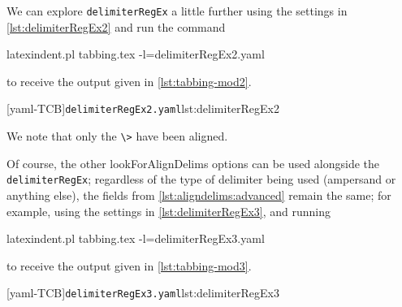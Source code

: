  \begin{example}
 We can explore \texttt{delimiterRegEx} a little further using the settings in
 \cref{lst:delimiterRegEx2} and run the command 

 \begin{commandshell}
latexindent.pl tabbing.tex -l=delimiterRegEx2.yaml
\end{commandshell}

 to receive the output given in \cref{lst:tabbing-mod2}. 

 \begin{cmhtcbraster}
  [yaml-TCB]{\texttt{delimiterRegEx2.yaml}}{lst:delimiterRegEx2}
 \end{cmhtcbraster}
 We note that only the \lstinline!\>! have been aligned.
 \end{example}

 \begin{example}
 Of course, the other lookForAlignDelims options can be used alongside the
 \texttt{delimiterRegEx}; regardless of the type of delimiter being used (ampersand or
 anything else), the fields from \vref{lst:aligndelims:advanced} remain the same; for
 example, using the settings in \cref{lst:delimiterRegEx3}, and running

 \begin{commandshell}
latexindent.pl tabbing.tex -l=delimiterRegEx3.yaml
\end{commandshell}

 to receive the output given in \cref{lst:tabbing-mod3}.

 \begin{cmhtcbraster}
  [yaml-TCB]{\texttt{delimiterRegEx3.yaml}}{lst:delimiterRegEx3}
 \end{cmhtcbraster}
 \end{example}

